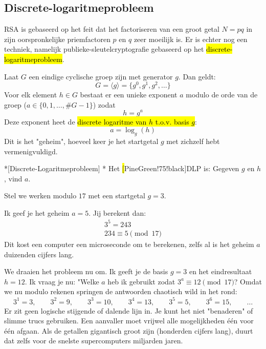 \subsection{Discrete-logaritmeprobleem}

RSA is gebaseerd op het feit dat het factoriseren van een groot getal $N=pq$ in zijn oorspronkelijke priemfactoren $p$ en $q$ zeer moeilijk is.
Er is echter nog een techniek, namelijk publieke-sleutelcryptografie gebaseerd op het \hl{discrete-logaritmeprobleem}.

Laat $G$ een eindige cyclische groep zijn met generator $g$. Dan geldt:
\begin{equation*}
    G = \langle g \rangle = \{g^0, g^1, g^2, \dots\}
\end{equation*}
Voor elk element $h \in G$ bestaat er een unieke exponent $a$ modulo de orde van de groep ($a \in \{0, 1, \dots, \#G-1\}$) zodat
\begin{equation*}
    h = g^a
\end{equation*} 
Deze exponent heet de \hl{discrete logaritme van $h$ t.o.v. basis $g$}:
\begin{equation*}
    a = \log_g(h)
\end{equation*}
Dit is het "geheim", hoeveel keer je het startgetal $g$ met zichzelf hebt vermenigvuldigd.

\begin{nicedefinition}*[Discrete-Logaritmeprobleem]
    \nextpart[]*
    Het \hl[PineGreen!75!black]{DLP} is: Gegeven $g$ en $h$, vind $a$.
\end{nicedefinition}


Stel we werken modulo $17$ met een startgetal $g=3$.

 Ik geef je het geheim $a=5$. Jij berekent dan:
\begin{equation*}
    \begin{gathered}
        3^5 = 243 \\
        234 \equiv 5 \pmod {17}
    \end{gathered}
\end{equation*}
Dit kost een computer een microseconde om te berekenen, zelfs al is het geheim $a$ duizenden cijfers lang.

 We draaien het probleem nu om. Ik geeft je de basis $g=3$ en het eindresultaat $h=12$. Ik vraag je nu: "Welke $a$ heb ik gebruikt zodat $3^a \equiv 12 \pmod {17}$? Omdat we nu modulo rekenen springen de antwoorden chaotisch wild in het rond:
\begin{equation*}
    3^1 = 3, \qquad 3^2 = 9, \qquad 3^3 = 10, \qquad 3^4 = 13, \qquad 3^5 = 5, \qquad 3^6 = 15, \qquad \dots
\end{equation*}
Er zit geen logische stijgende of dalende lijn in. Je kunt het niet "benaderen" of slimme trucs gebruiken. Een aanvaller moet vrijwel alle mogelijkheden één voor één afgaan. Als de getallen gigantisch groot zijn (honderden cijfers lang), duurt dat zelfs voor de snelste supercomputers miljarden jaren.

